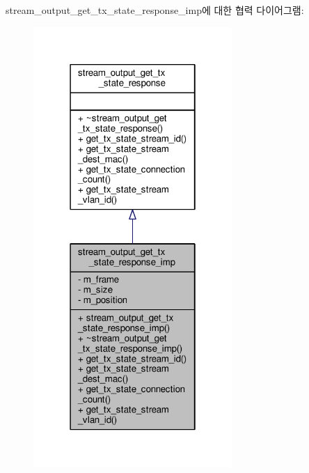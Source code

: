 stream\+\_\+output\+\_\+get\+\_\+tx\+\_\+state\+\_\+response\+\_\+imp에 대한 협력 다이어그램\+:
\nopagebreak
\begin{figure}[H]
\begin{center}
\leavevmode
\includegraphics[width=214pt]{classavdecc__lib_1_1stream__output__get__tx__state__response__imp__coll__graph}
\end{center}
\end{figure}
